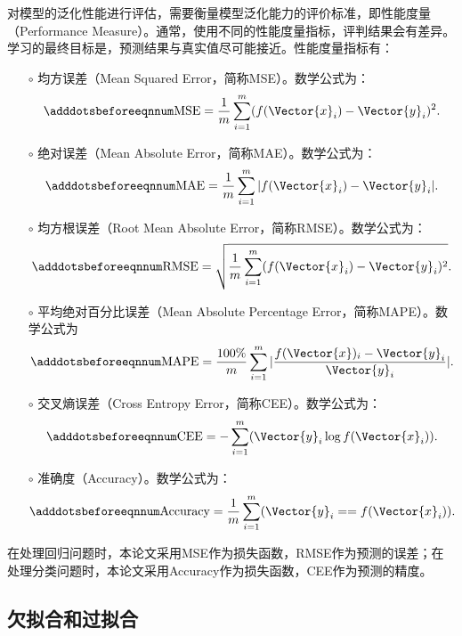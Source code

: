 对模型的泛化性能进行评估，需要衡量模型泛化能力的评价标准，即性能度量（Performance Measure）。通常，使用不同的性能度量指标，评判结果会有差异。学习的最终目标是，预测结果与真实值尽可能接近。性能度量指标有：
\begin{enumerate}
  \item[$\circ$] 均方误差（Mean Squared Error，简称MSE）。数学公式为：
  \begin{equation}\adddotsbeforeeqnnum
    \label{eq:ml_mse}
    \text{MSE}=\frac{1}{m}\sum_{i=1}^{m}(f(\Vector{x}_i)-\Vector{y}_i)^2.
  \end{equation}
  \item[$\circ$] 绝对误差（Mean Absolute Error，简称MAE）。数学公式为：
  \begin{equation}\adddotsbeforeeqnnum
    \label{eq:ml_mae}
    \text{MAE}=\frac{1}{m}\sum_{i=1}^{m}|f(\Vector{x}_i)-\Vector{y}_i|.
  \end{equation}
  \item[$\circ$] 均方根误差（Root Mean Absolute Error，简称RMSE）。数学公式为：
  \begin{equation}\adddotsbeforeeqnnum
    \label{eq:ml_rmse}
    \text{RMSE}=\sqrt{\frac{1}{m}\sum_{i=1}^{m}(f(\Vector{x}_i)-\Vector{y}_i)^2}.
  \end{equation}
  \item[$\circ$] 平均绝对百分比误差（Mean Absolute Percentage Error，简称MAPE）。数学公式为
  \begin{equation}\adddotsbeforeeqnnum
    \label{eq:ml_mape}
    \text{MAPE}=\frac{100\%}{m}\sum_{i=1}^{m}|\frac{f(\Vector{x})_i-\Vector{y}_i}{\Vector{y}_i}|.
  \end{equation}
  \item[$\circ$] 交叉熵误差（Cross Entropy Error，简称CEE）。数学公式为：
  \begin{equation}\adddotsbeforeeqnnum
    \label{eq:ml_cee}
    \text{CEE}=-\sum_{i=1}^{m}(\Vector{y}_i\log f(\Vector{x}_i)).
  \end{equation}
  \item[$\circ$] 准确度（Accuracy）。数学公式为：
  \begin{equation}\adddotsbeforeeqnnum
    \label{eq:ml_acc}
    \text{Accuracy}=\frac{1}{m}\sum_{i=1}^{m}(\Vector{y}_i == f(\Vector{x}_i)).
  \end{equation}
\end{enumerate}
在处理回归问题时，本论文采用MSE作为损失函数，RMSE作为预测的误差；在处理分类问题时，本论文采用Accuracy作为损失函数，CEE作为预测的精度。

\subsection{欠拟合和过拟合}\label{sec:ml_fitting}

